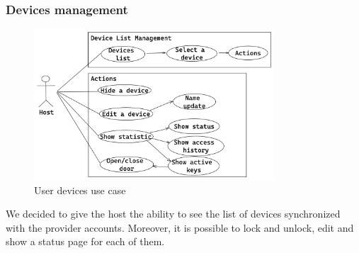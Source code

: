 \subsubsection{Devices management}
\begin{figure}[H]
    \centering
    \includegraphics[width=0.8\textwidth]{figures/devices.excalidraw.png}
    \caption{User devices use case}
    \label{fig:deviceusecase}
\end{figure}
We decided to give the host the ability to see the list of devices synchronized with the provider accounts. Moreover, it is possible to lock and unlock, edit and show a status page for each of them.
